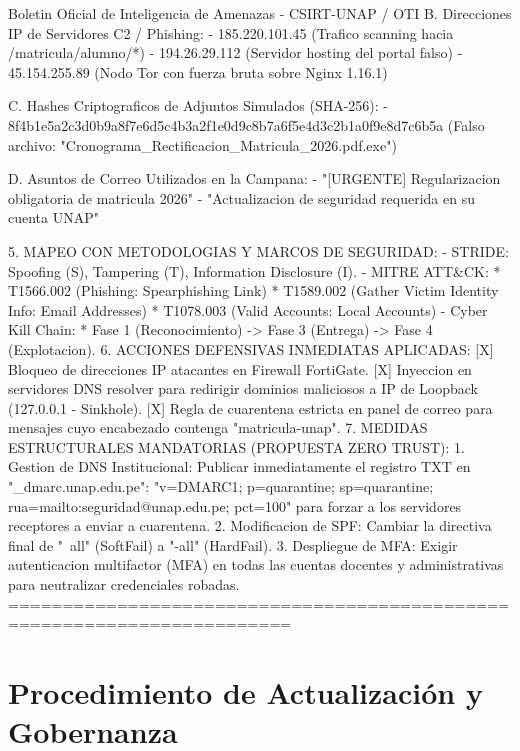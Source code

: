 \begin{cmdbox}{Boletin Oficial de Inteligencia de Amenazas - CSIRT-UNAP / OTI}
   B. Direcciones IP de Servidores C2 / Phishing:
      - 185.220.101.45 (Trafico scanning hacia /matricula/alumno/*)
      - 194.26.29.112  (Servidor hosting del portal falso)
      - 45.154.255.89  (Nodo Tor con fuerza bruta sobre Nginx 1.16.1)

   C. Hashes Criptograficos de Adjuntos Simulados (SHA-256):
      - 8f4b1e5a2c3d0b9a8f7e6d5c4b3a2f1e0d9c8b7a6f5e4d3c2b1a0f9e8d7c6b5a
        (Falso archivo: "Cronograma_Rectificacion_Matricula_2026.pdf.exe")

   D. Asuntos de Correo Utilizados en la Campana:
      - "[URGENTE] Regularizacion obligatoria de matricula 2026"
      - "Actualizacion de seguridad requerida en su cuenta UNAP"

5. MAPEO CON METODOLOGIAS Y MARCOS DE SEGURIDAD:
   - STRIDE: Spoofing (S), Tampering (T), Information Disclosure (I).
   - MITRE ATT&CK: 
     * T1566.002 (Phishing: Spearphishing Link)
     * T1589.002 (Gather Victim Identity Info: Email Addresses)
     * T1078.003 (Valid Accounts: Local Accounts)
   - Cyber Kill Chain: 
     * Fase 1 (Reconocimiento) -> Fase 3 (Entrega) -> Fase 4 (Explotacion).
6. ACCIONES DEFENSIVAS INMEDIATAS APLICADAS:
   [X] Bloqueo de direcciones IP atacantes en Firewall FortiGate.
   [X] Inyeccion en servidores DNS resolver para redirigir dominios
       maliciosos a IP de Loopback (127.0.0.1 - Sinkhole).
   [X] Regla de cuarentena estricta en panel de correo para mensajes
       cuyo encabezado contenga "matricula-unap".
7. MEDIDAS ESTRUCTURALES MANDATORIAS (PROPUESTA ZERO TRUST):
   1. Gestion de DNS Institucional:
      Publicar inmediatamente el registro TXT en "_dmarc.unap.edu.pe":
      "v=DMARC1; p=quarantine; sp=quarantine; rua=mailto:seguridad@unap.edu.pe; pct=100"
      para forzar a los servidores receptores a enviar a cuarentena.
   2. Modificacion de SPF:
      Cambiar la directiva final de "~all" (SoftFail) a "-all" (HardFail).
   3. Despliegue de MFA:
      Exigir autenticacion multifactor (MFA) en todas las cuentas docentes
      y administrativas para neutralizar credenciales robadas.
========================================================================
\end{cmdbox}

\vspace{-1.5em}

\section{Procedimiento de Actualización y Gobernanza}


